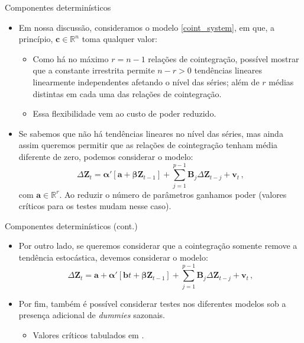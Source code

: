 \documentclass[11pt]{beamer}
\begin{document}
\begin{frame}{Componentes determinísticos}
\begin{itemize}
	\item Em nossa discussão, consideramos o modelo \eqref{coint_system}, em que, a princípio, $\boldsymbol{c} \in \mathbb{R}^n$ toma qualquer valor:
	\begin{itemize}
		\item Como há no máximo $r = n-1$ relações de cointegração, possível mostrar que a constante irrestrita permite $n - r> 0$ tendências lineares linearmente independentes  afetando o nível das séries; além de $r$ médias distintas em cada uma das relações de cointegração.
		\item Essa flexibilidade vem ao custo de poder reduzido.
	\end{itemize} 
	\item Se sabemos que não há tendências lineares no nível das séries, mas ainda assim queremos permitir que as relações de cointegração tenham média diferente de zero, podemos considerar o modelo: 
			\begin{equation*}
		\Delta \boldsymbol{Z}_t  = \boldsymbol{\alpha}'[\boldsymbol{a} + \boldsymbol{\beta} \boldsymbol{Z}_{t-1} ]+ \sum_{j=1}^{p-1} \boldsymbol{B}_{j} \Delta  \boldsymbol{Z}_{t-j} + \boldsymbol{v}_t \, , 
	\end{equation*}
	com $\boldsymbol{a} \in \mathbb{R}^{r}$. Ao reduzir o número de parâmetros ganhamos poder (valores críticos para os testes mudam nesse caso).
\end{itemize}
\end{frame}

\begin{frame}{Componentes determinísticos (cont.)}
	\begin{itemize}
	\item Por outro lado, se queremos considerar que a cointegração somente remove a tendência estocástica, devemos considerar o modelo:
\begin{equation*}
	\Delta \boldsymbol{Z}_t  =\boldsymbol{a}+ \boldsymbol{\alpha}'[\boldsymbol{b}t + \boldsymbol{\beta} \boldsymbol{Z}_{t-1} ]+ \sum_{j=1}^{p-1} \boldsymbol{B}_{j} \Delta  \boldsymbol{Z}_{t-j} + \boldsymbol{v}_t \, , 
\end{equation*}
\item Por fim, também é possível considerar testes nos diferentes modelos sob a presença adicional de \textit{dummies} sazonais.
	\begin{itemize}
	\item Valores críticos tabulados em \citet{Johansen1995}.
\end{itemize}
	\end{itemize}

\end{frame}
\end{document}
